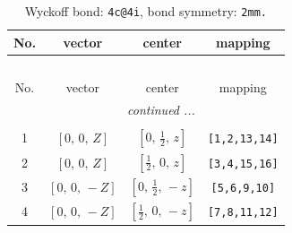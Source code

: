 \documentclass[fleqn,8pt]{jsarticle}
\begin{document}
\renewcommand{\arraystretch}{1.2}
\begin{longtable}{cccc}
\caption{Wyckoff bond: {\tt 4c@4i}, bond symmetry: {\tt 2mm.}}
 \\
 \hline \hline
No. & vector & center & mapping \\ \hline \endfirsthead

\multicolumn{3}{l}{\tablename\ \thetable{}} \\
 \hline \hline
No. & vector & center & mapping \\ \hline \endhead

 \hline \hline
\multicolumn{3}{r}{\footnotesize\it continued ...} \\ \endfoot

 \hline \hline
\multicolumn{3}{r}{} \\ \endlastfoot

1 & $\left[ 0,\, 0,\, Z \right]$ & $\left[ 0,\, \frac{1}{2},\, z \right]$ & {\tt [1,2,13,14]} \\ \hline
2 & $\left[ 0,\, 0,\, Z \right]$ & $\left[ \frac{1}{2},\, 0,\, z \right]$ & {\tt [3,4,15,16]} \\ \hline
3 & $\left[ 0,\, 0,\, - Z \right]$ & $\left[ 0,\, \frac{1}{2},\, - z \right]$ & {\tt [5,6,9,10]} \\ \hline
4 & $\left[ 0,\, 0,\, - Z \right]$ & $\left[ \frac{1}{2},\, 0,\, - z \right]$ & {\tt [7,8,11,12]} \\
\end{longtable}
\renewcommand{\arraystretch}{1.2}
\end{document}
